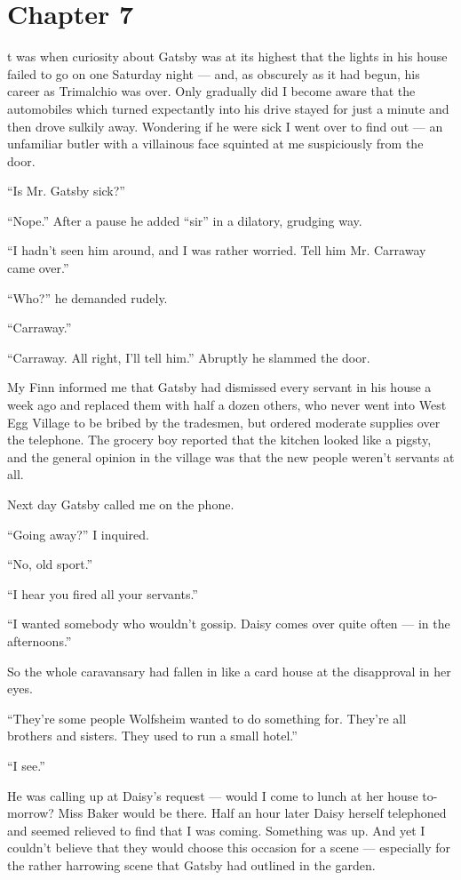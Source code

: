 \documentclass{znotebook}
\begin{document}
\chapter{Chapter 7}

\lettrine[findent=2pt]{}{ }t was when curiosity about Gatsby was at its highest that the lights in his house failed to go on one Saturday night — and, as obscurely as it had begun, his career as Trimalchio was over. Only gradually did I become aware that the automobiles which turned expectantly into his drive stayed for just a minute and then drove sulkily away. Wondering if he were sick I went over to find out — an unfamiliar butler with a villainous face squinted at me suspiciously from the door.

``Is Mr. Gatsby sick?''

``Nope.'' After a pause he added ``sir'' in a dilatory, grudging way.

``I hadn't seen him around, and I was rather worried. Tell him Mr. Carraway came over.''

``Who?'' he demanded rudely.

``Carraway.''

``Carraway. All right, I'll tell him.'' Abruptly he slammed the door.

My Finn informed me that Gatsby had dismissed every servant in his house a week ago and replaced them with half a dozen others, who never went into West Egg Village to be bribed by the tradesmen, but ordered moderate supplies over the telephone. The grocery boy reported that the kitchen looked like a pigsty, and the general opinion in the village was that the new people weren't servants at all.

Next day Gatsby called me on the phone.

``Going away?'' I inquired.

``No, old sport.''

``I hear you fired all your servants.''

``I wanted somebody who wouldn't gossip. Daisy comes over quite often — in the afternoons.''

So the whole caravansary had fallen in like a card house at the disapproval in her eyes.

``They're some people Wolfsheim wanted to do something for. They're all brothers and sisters. They used to run a small hotel.''

``I see.''

He was calling up at Daisy's request — would I come to lunch at her house to-morrow? Miss Baker would be there. Half an hour later Daisy herself telephoned and seemed relieved to find that I was coming. Something was up. And yet I couldn't believe that they would choose this occasion for a scene — especially for the rather harrowing scene that Gatsby had outlined in the garden.
\end{document}
